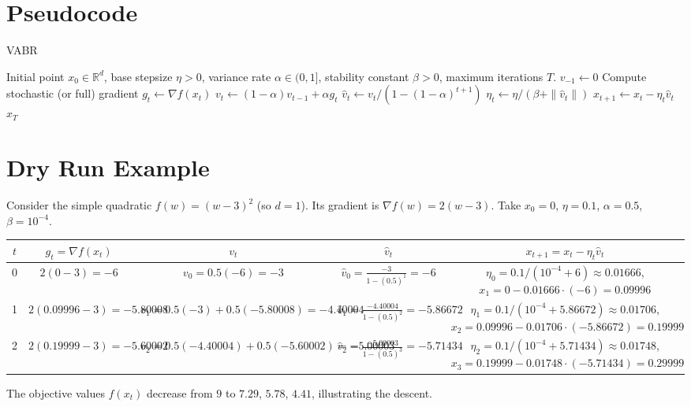 \documentclass{article}
\newcommand{\R}{\mathbb{R}}
\begin{document}
\section{Pseudocode}
\begin{algorithm}[H]
\caption{VABR}
\begin{algorithmic}[1]
\REQUIRE Initial point $x_0\in\R^{d}$, base stepsize $\eta>0$, variance rate $\alpha\in(0,1]$, stability constant $\beta>0$, maximum iterations $T$.
\STATE $v_{-1}\gets 0$ 
    \STATE Compute stochastic (or full) gradient $g_t\gets \nabla f(x_t)$
    \STATE $v_t \gets (1-\alpha)v_{t-1}+ \alpha g_t$ 
    \STATE $\hat v_t \gets v_t/(1-(1-\alpha)^{t+1})$ 
    \STATE $\eta_t \gets \eta/(\beta+\|\hat v_t\|)$ 
    \STATE $x_{t+1} \gets x_t - \eta_t \hat v_t$ 
\ENDFOR
\RETURN $x_T$
\end{algorithmic}
\end{algorithm}

\section{Dry Run Example}
Consider the simple quadratic $f(w)=(w-3)^2$ (so $d=1$).  
Its gradient is $\nabla f(w)=2(w-3)$.  
Take $x_0=0$, $\eta=0.1$, $\alpha=0.5$, $\beta=10^{-4}$.

\begin{center}
\begin{tabular}{c|c|c|c|c}
$t$ & $g_t=\nabla f(x_t)$ & $v_t$ & $\hat v_t$ & $x_{t+1}=x_t-\eta_t\hat v_t$\\ \hline
0 & $2(0-3)=-6$ & $v_0=0.5(-6)=-3$ & $\hat v_0=\frac{-3}{1-(0.5)^{1}}=-6$ & $\eta_0=0.1/(10^{-4}+6)\approx0.01666$, $x_1=0-0.01666\cdot(-6)=0.09996$\\ \hline
1 & $2(0.09996-3)=-5.80008$ & $v_1=0.5(-3)+0.5(-5.80008)=-4.40004$ & $\hat v_1=\frac{-4.40004}{1-(0.5)^{2}}=-5.86672$ & $\eta_1=0.1/(10^{-4}+5.86672)\approx0.01706$, $x_2=0.09996-0.01706\cdot(-5.86672)=0.19999$\\ \hline
2 & $2(0.19999-3)=-5.60002$ & $v_2=0.5(-4.40004)+0.5(-5.60002)=-5.00003$ & $\hat v_2=\frac{-5.00003}{1-(0.5)^{3}}=-5.71434$ & $\eta_2=0.1/(10^{-4}+5.71434)\approx0.01748$, $x_3=0.19999-0.01748\cdot(-5.71434)=0.29999$\\
\end{tabular}
\end{center}
The objective values $f(x_t)$ decrease from $9$ to $7.29$, $5.78$, $4.41$, illustrating the descent.
\end{document}
